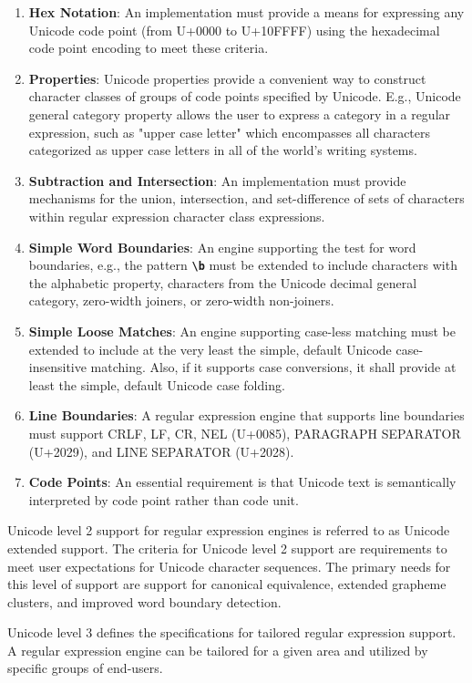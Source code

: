 \begin{enumerate}
    \item \textbf{Hex Notation}: An implementation must provide a means for expressing any Unicode code point (from U+0000 to U+10FFFF) using the hexadecimal code point encoding to meet these criteria.
    \item \textbf{Properties}: Unicode properties provide a convenient way to construct character classes of groups of code points specified by Unicode. E.g., Unicode general category property allows the user to express a category in a regular expression, such as "upper case letter" which encompasses all characters categorized as upper case letters in all of the world's writing systems.
    \item \textbf{Subtraction and Intersection}: An implementation must provide mechanisms for the union, intersection, and set-difference of sets of characters within regular expression character class expressions.
    \item \textbf{Simple Word Boundaries}: An engine supporting the test for word boundaries, e.g., the pattern \texttt{\textbf{\textbackslash b}} must be extended to include characters with the alphabetic property, characters from the Unicode decimal general category, zero-width joiners, or zero-width non-joiners.
    \item \textbf{Simple Loose Matches}: An engine supporting case-less matching must be extended to include at the very least the simple, default Unicode case-insensitive matching. Also, if it supports case conversions, it shall provide at least the simple, default Unicode case folding.
    \item \textbf{Line Boundaries}: A regular expression engine that supports line boundaries must support CRLF, LF, CR, NEL (U+0085), PARAGRAPH SEPARATOR (U+2029), and LINE SEPARATOR (U+2028).
    \item \textbf{Code Points}: An essential requirement is that Unicode text is semantically interpreted by code point rather than code unit.
\end{enumerate}

Unicode level 2 support for regular expression engines is referred to as Unicode extended support. The criteria for Unicode level 2 support are requirements to meet user expectations for Unicode character sequences. The primary needs for this level of support are support for canonical equivalence, extended grapheme clusters, and improved word boundary detection.

Unicode level 3 defines the specifications for tailored regular expression support. A regular expression engine can be tailored for a given area and utilized by specific groups of end-users.

